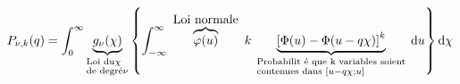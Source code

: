 \begin{equation}
   P _{\nu , k} (q) = \int _{0}^{\infty} \underbrace{g _{\nu} (\chi )}_{\begin{subarray}{ l }\text{Loi du} \chi \\ \text {de degré} \nu \end{subarray}} \left\{\int_{-\infty}^{\infty} \overbrace{\varphi ( u )}^{\mbox{ Loi normale }} k \underbrace{\left [ \Phi (u ) -\Phi ( u - q \chi ) \right ]^{ k } }_{\begin{subarray}{ l }\text{ Probabilit é que k variables soient } \\ \text{ contenues dans }[ u - q \chi ; u ] \end{subarray}} \mathrm{ d} u \right\} \mathrm{ d } \chi
\end{equation}
